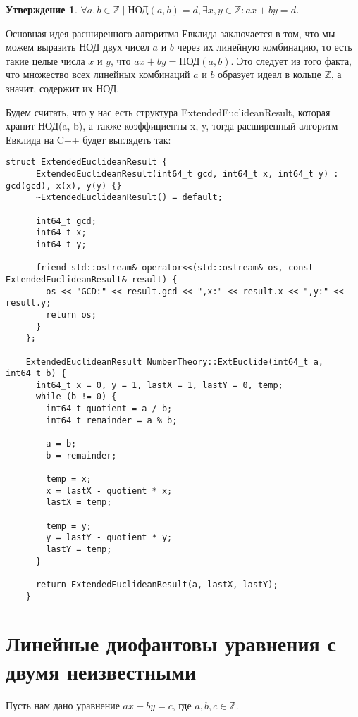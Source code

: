 \documentclass[12pt, a4paper, openany]{book}
\newtheorem*{statement}{Утверждение}
\begin{document}
\begin{statement}
    $\forall a, b \in \mathbb{Z} \mid \text{НОД}(a, b) = d, \exists x, y \in \mathbb{Z}: ax + by = d$.
\end{statement}

    Основная идея расширенного алгоритма Евклида заключается в том, что мы можем выразить НОД двух чисел $a$ и $b$ через их линейную комбинацию, то есть такие целые числа $x$ и $y$, что $ax + by = \text{НОД}(a, b)$. Это следует из того факта, что множество всех линейных комбинаций $a$ и $b$ образует идеал в кольце $\mathbb{Z}$, а значит, содержит их НОД.
    
    Будем считать, что у нас есть структура ExtendedEuclideanResult, которая хранит НОД(a, b), а также коэффициенты x, y, тогда расширенный алгоритм Евклида на C++ будет выглядеть так:

\newpage
\begin{lstlisting}[breaklines=true]
    struct ExtendedEuclideanResult {
      ExtendedEuclideanResult(int64_t gcd, int64_t x, int64_t y) : gcd(gcd), x(x), y(y) {}
      ~ExtendedEuclideanResult() = default;
    
      int64_t gcd;
      int64_t x;
      int64_t y;
    
      friend std::ostream& operator<<(std::ostream& os, const ExtendedEuclideanResult& result) {
        os << "GCD:" << result.gcd << ",x:" << result.x << ",y:" << result.y;
        return os;
      }
    };
    
    ExtendedEuclideanResult NumberTheory::ExtEuclide(int64_t a, int64_t b) {
      int64_t x = 0, y = 1, lastX = 1, lastY = 0, temp;
      while (b != 0) {
        int64_t quotient = a / b;
        int64_t remainder = a % b;
    
        a = b;
        b = remainder;
    
        temp = x;
        x = lastX - quotient * x;
        lastX = temp;
    
        temp = y;
        y = lastY - quotient * y;
        lastY = temp;
      }
    
      return ExtendedEuclideanResult(a, lastX, lastY);
    }
\end{lstlisting}

\section{Линейные диофантовы уравнения с двумя
неизвестными}

    Пусть нам дано уравнение $ax + by = c$, где $a, b, c \in \mathbb{Z}$.
    
\end{document}
